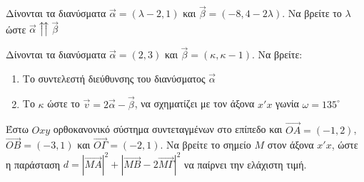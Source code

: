 \documentclass[greek]{beamer}
\begin{document}
\begin{askisi}
  Δίνονται τα διανύσματα $\vec{α}=(λ-2,1)$ και $\vec{β}=(-8,4-2λ)$. Να βρείτε το $λ$ ώστε $\vec{α}\upuparrows \vec{β}$

\end{askisi}

\begin{askisi}
  Δίνονται τα διανύσματα $\vec{α}=(2,3)$ και $\vec{β}=(κ,κ-1)$. Να βρείτε:
  \begin{enumerate}
    \item<1-> Το συντελεστή διεύθυνσης του διανύσματος $\vec{α}$
    \item<2-> Το $κ$ ώστε το $\vec{v}=2\vec{α}-\vec{β}$, να σχηματίζει με τον άξονα $x'x$ γωνία $ω=135^{\circ}$
  \end{enumerate}

\end{askisi}

\begin{askisi}
  Έστω $Οxy$ ορθοκανονικό σύστημα συντεταγμένων στο επίπεδο και $\overrightarrow{ΟΑ}=(-1,2)$, $\overrightarrow{ΟΒ}=(-3,1)$ και $\overrightarrow{ΟΓ}=(-2,1)$. Να βρείτε το σημείο $Μ$ στον άξονα $x'x$, ώστε η παράσταση $d=|\overrightarrow{ΜΑ}|^2+|\overrightarrow{ΜΒ}-2\overrightarrow{ΜΓ}|^2$ να παίρνει την ελάχιστη τιμή.

\end{askisi}
\end{document}
